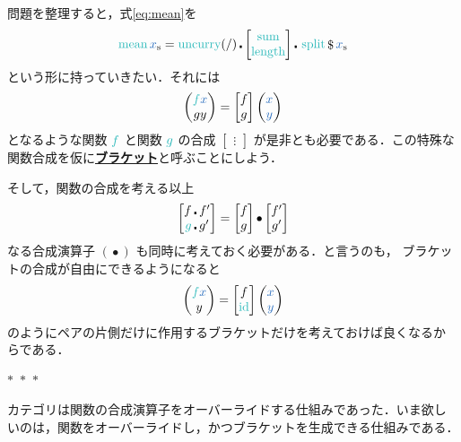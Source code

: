 \documentclass[a5paper,twoside,fleqn,draft]{jsbook}
\def\varColor{NavyBlue}
\def\funcColor{BlueGreen}
\newcommand{\separator}{\begin{center}$*$~$*$~$*$\end{center}}
\newcommand{\keyword}[1]{{\underline{\textbf{#1}}}}
\newcommand{\mVar}[1]{\textcolor{\varColor}{#1}}
\newcommand{\mXVar}{\mVar{x}}
\newcommand{\mYVar}{\mVar{y}}
\newcommand{\mFunc}[1]{\textcolor{\funcColor}{#1}}
\newcommand{\mSpecialFunc}[1]{\textcolor{\funcColor}{\textrm{#1}}}
\newcommand{\mFFunc}{{\mFunc{f}}}
\newcommand{\mGFunc}{\mFunc{g}}
\DeclareMathOperator{\mId}{\mSpecialFunc{id}}
\DeclareMathOperator{\mLength}{\mSpecialFunc{length}}
\DeclareMathOperator{\mMean}{\mSpecialFunc{mean}}
\DeclareMathOperator{\mSplit}{\mSpecialFunc{split}}
\DeclareMathOperator{\mSum}{\mSpecialFunc{sum}}
\DeclareMathOperator{\mUncurry}{\mSpecialFunc{uncurry}}
\DeclareMathOperator{\mApply}{\$}
\DeclareMathOperator{\mCompFunc}{\centerdot}
\DeclareMathOperator{\mCompCat}{\bullet}
\newcommand{\mPairWith}[2]{\begin{pmatrix}#1\\#2\end{pmatrix}}
\newcommand{\mList}[1]{\mVar{#1}_\mathrm{s}}
\begin{document}
問題を整理すると，式\eqref{eq:mean}を
\begin{equation}
  \mMean\mList{x}
  =\mUncurry(/)
  \mCompFunc
  \begin{bmatrix}
    \mSum\\
    \mLength
  \end{bmatrix}
  \mCompFunc{}
  \mSplit
  \mApply
  \mList{x}
\end{equation}
という形に持っていきたい．それには
\begin{equation}
  \mPairWith{\mFFunc\mXVar}{gy}
  =
  \begin{bmatrix}
    f\\
    g
  \end{bmatrix}
  \mPairWith{\mXVar}{\mYVar}
\end{equation}
となるような関数 $\mFFunc$ と関数 $\mGFunc$ の合成
$\begin{bmatrix}\vdots\end{bmatrix}$ が是非とも必要である．この特殊な
  関数合成を仮に\keyword{ブラケット}と呼ぶことにしよう．

そして，関数の合成を考える以上
\begin{equation}
  \begin{bmatrix}
    f\mCompFunc f'\\
    \mGFunc\mCompFunc g'
  \end{bmatrix}
  =
  \begin{bmatrix}
    f\\
    g
  \end{bmatrix}
  \mCompCat
  \begin{bmatrix}
    f'\\
    g'
  \end{bmatrix}
\end{equation}
なる合成演算子 $(\mCompCat)$ も同時に考えておく必要がある．と言うのも，
ブラケットの合成が自由にできるようになると
\begin{equation}
  \mPairWith{\mFFunc\mXVar}{y}
  =
  \begin{bmatrix}
    f\\
    \mId
  \end{bmatrix}
  \mPairWith{\mXVar}{\mYVar}
\end{equation}
のようにペアの片側だけに作用するブラケットだけを考えておけば良くなるか
らである．

\separator

カテゴリは関数の合成演算子をオーバーライドする仕組みであった．いま欲し
いのは，関数をオーバーライドし，かつブラケットを生成できる仕組みである．
\end{document}
